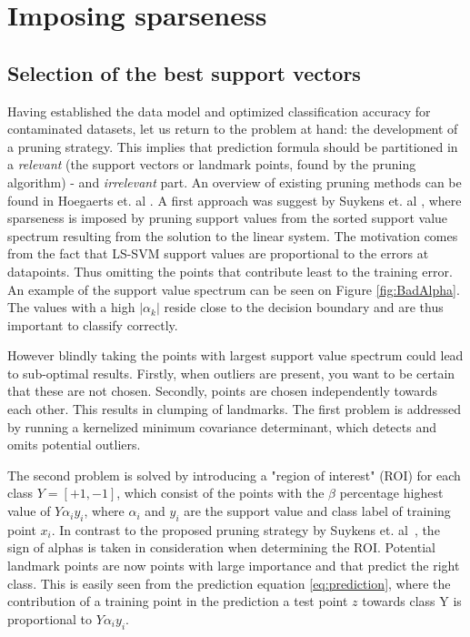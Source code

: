 \documentclass[preprint,12pt]{elsarticle}
\begin{document}
\newpage
\section{Imposing sparseness}

\subsection{Selection of the best support vectors}

Having established the data model and optimized classification accuracy for contaminated datasets, let us return to the problem at hand: the development of a pruning strategy. This implies that prediction formula should be partitioned in a \textit{relevant} (the support vectors or landmark points, found by the pruning algorithm) - and \textit{irrelevant} part.  An overview of existing pruning methods can be found in Hoegaerts et. al \cite{hoegaerts2004comparison}. A first approach was suggest by Suykens et. al \cite{suykens2000sparse}, where  sparseness is imposed by pruning support values from the sorted support value spectrum resulting from the solution to the linear system.  The motivation comes from the fact that LS-SVM support values are proportional to the errors at datapoints. Thus omitting the points that contribute least to the training error. An example of the support value spectrum can be seen on Figure \ref{fig:BadAlpha}. The values with a high $|\alpha_k|$ reside close to the decision boundary and are thus important to classify correctly. 

However blindly taking the points with largest support value spectrum could lead to sub-optimal results. Firstly, when outliers are present, you want to be certain that these are not chosen. Secondly, points are chosen independently towards each other. This results in clumping of landmarks. The first problem is addressed by running a kernelized minimum covariance determinant, which detects and omits potential outliers. 

The second problem is solved by introducing a "region of interest" (ROI) for each class $Y = [+1,-1]$, which consist of the points with the $\beta$ percentage highest value of $Y \alpha_iy_i$, where $\alpha_i$ and $y_i$ are the support value and class label of training point $x_i$. In contrast to the proposed pruning strategy by Suykens et. al~\cite{suykens2000sparse}, the sign of alphas is taken in consideration when determining the ROI. Potential landmark points are now points with large importance and that predict the right class. This is easily seen from the prediction equation \eqref{eq:prediction}, where the contribution of a training point in the prediction a test point $z$ towards class Y is proportional to $Y \alpha_iy_i$. 
\end{document}
